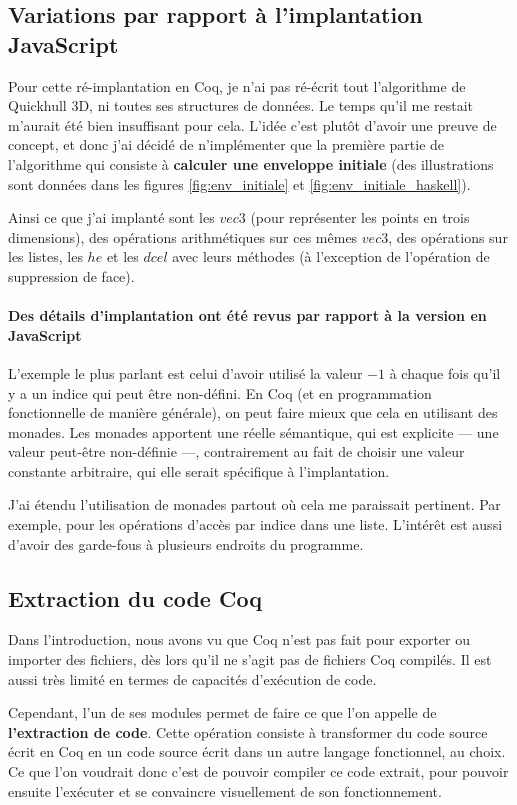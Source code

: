 \documentclass[]{article}
\begin{document}
\subsection{Variations par rapport à l'implantation JavaScript}
Pour cette ré-implantation en Coq, je n'ai pas ré-écrit tout l'algorithme de Quickhull 3D, ni toutes ses structures de données. Le temps qu'il me restait m'aurait été bien insuffisant pour cela. L'idée c'est plutôt d'avoir une preuve de concept, et donc j'ai décidé de n'implémenter que la première partie de l'algorithme qui consiste à \textbf{calculer une enveloppe initiale} (des illustrations sont données dans les  figures \ref{fig:env_initiale} et \ref{fig:env_initiale_haskell}).

Ainsi ce que j'ai implanté sont les $vec3$ (pour représenter les points en trois dimensions), des opérations arithmétiques sur ces mêmes $vec3$, des opérations sur les listes, les $he$ et les $dcel$ avec leurs méthodes (à l'exception de l'opération de suppression de face).

\paragraph{Des détails d'implantation ont été revus par rapport à la version en JavaScript}
L'exemple le plus parlant est celui d'avoir utilisé la valeur $-1$ à chaque fois qu'il y a un indice qui peut être non-défini. En Coq (et en programmation fonctionnelle de manière générale), on peut faire mieux que cela en utilisant des monades. Les monades apportent une réelle sémantique, qui est explicite — une valeur peut-être non-définie —, contrairement au fait de choisir une valeur constante arbitraire, qui elle serait spécifique à l'implantation.

J'ai étendu l'utilisation de monades partout où cela me paraissait pertinent. Par exemple, pour les opérations d'accès par indice dans une liste. L'intérêt est aussi d'avoir des garde-fous à plusieurs endroits du programme.

\subsection{Extraction du code Coq}
Dans l'introduction, nous avons vu que Coq n'est pas fait pour exporter ou importer des fichiers, dès lors qu'il ne s'agit pas de fichiers Coq compilés. Il est aussi très limité en termes de capacités d'exécution de code.

Cependant, l'un de ses modules permet de faire ce que l'on appelle de \textbf{l'extraction de code}. Cette opération consiste à transformer du code source écrit en Coq en un code source écrit dans un autre langage fonctionnel, au choix. Ce que l'on voudrait donc c'est de pouvoir compiler ce code extrait, pour pouvoir ensuite l'exécuter et se convaincre visuellement de son fonctionnement.
\end{document}
